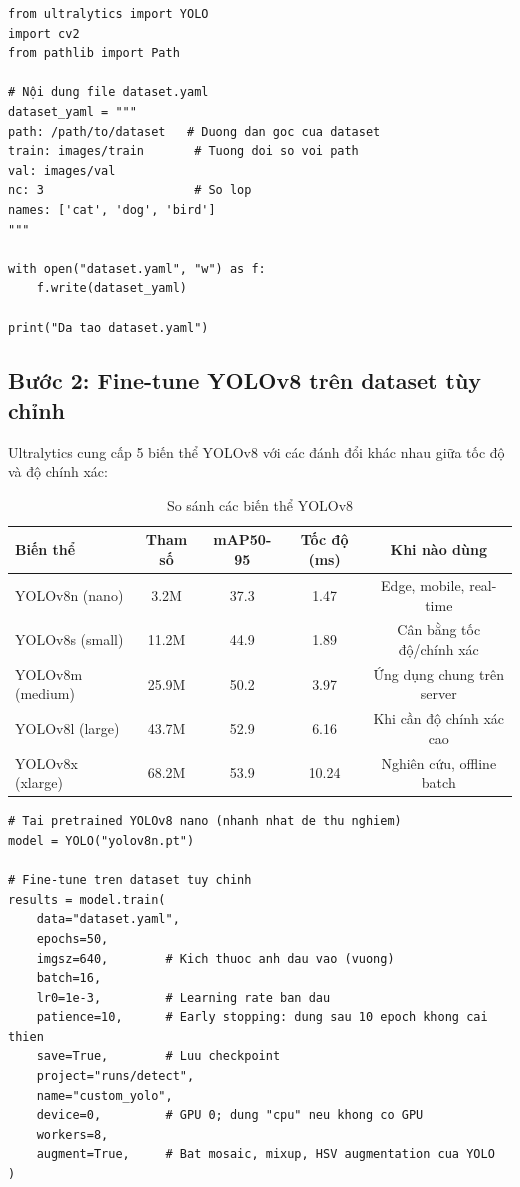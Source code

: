 \begin{verbatim}
from ultralytics import YOLO
import cv2
from pathlib import Path

# Nội dung file dataset.yaml
dataset_yaml = """
path: /path/to/dataset   # Duong dan goc cua dataset
train: images/train       # Tuong doi so voi path
val: images/val
nc: 3                     # So lop
names: ['cat', 'dog', 'bird']
"""

with open("dataset.yaml", "w") as f:
    f.write(dataset_yaml)

print("Da tao dataset.yaml")
\end{verbatim}

\subsection{Bước 2: Fine-tune YOLOv8 trên dataset tùy chỉnh}
\label{subsec:yolo_finetune}

Ultralytics cung cấp 5 biến thể YOLOv8 với các đánh đổi khác nhau giữa tốc độ và độ chính xác:

\begin{table}[h]
\centering
\caption{So sánh các biến thể YOLOv8}
\label{tab:yolov8_variants}
\begin{tabular}{lcccc}
\hline
\textbf{Biến thể} & \textbf{Tham số} & \textbf{mAP50-95} & \textbf{Tốc độ (ms)} & \textbf{Khi nào dùng} \\
\hline
YOLOv8n (nano)   & 3.2M   & 37.3 & 1.47  & Edge, mobile, real-time \\
YOLOv8s (small)  & 11.2M  & 44.9 & 1.89  & Cân bằng tốc độ/chính xác \\
YOLOv8m (medium) & 25.9M  & 50.2 & 3.97  & Ứng dụng chung trên server \\
YOLOv8l (large)  & 43.7M  & 52.9 & 6.16  & Khi cần độ chính xác cao \\
YOLOv8x (xlarge) & 68.2M  & 53.9 & 10.24 & Nghiên cứu, offline batch \\
\hline
\end{tabular}
\end{table}

\begin{verbatim}
# Tai pretrained YOLOv8 nano (nhanh nhat de thu nghiem)
model = YOLO("yolov8n.pt")

# Fine-tune tren dataset tuy chinh
results = model.train(
    data="dataset.yaml",
    epochs=50,
    imgsz=640,        # Kich thuoc anh dau vao (vuong)
    batch=16,
    lr0=1e-3,         # Learning rate ban dau
    patience=10,      # Early stopping: dung sau 10 epoch khong cai thien
    save=True,        # Luu checkpoint
    project="runs/detect",
    name="custom_yolo",
    device=0,         # GPU 0; dung "cpu" neu khong co GPU
    workers=8,
    augment=True,     # Bat mosaic, mixup, HSV augmentation cua YOLO
)
\end{verbatim}

